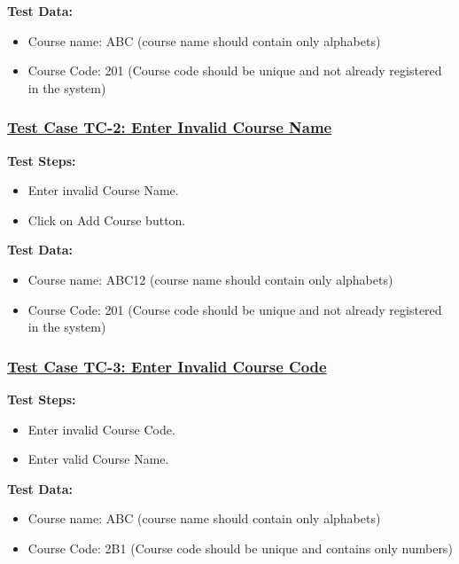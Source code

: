 \textbf{Test Data:}
\begin{itemize}

\item Course name: ABC (course name should contain only alphabets)
\item Course Code: 201 (Course code should be unique and not already registered in the system)

\end{itemize}

\subsubsection{\underline{Test Case TC-2: Enter Invalid Course Name}}
\textbf{Test Steps:}
\begin{itemize}

\item Enter invalid Course Name.
\item Click on Add Course button.

\end{itemize}

\textbf{Test Data:}
\begin{itemize}

\item Course name: ABC12 (course name should contain only alphabets)
\item Course Code: 201 (Course code should be unique and not already registered in the system)

\end{itemize}

\subsubsection{\underline{Test Case TC-3: Enter Invalid Course Code}}
\textbf{Test Steps:}
\begin{itemize}

\item Enter invalid Course Code.
\item Enter valid Course Name.

\end{itemize}

\textbf{Test Data:}
\begin{itemize}

\item Course name: ABC (course name should contain only alphabets)
\item Course Code: 2B1 (Course code should be unique and contains only numbers)

\end{itemize}


